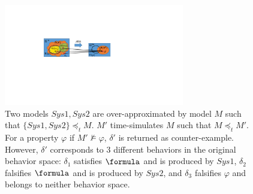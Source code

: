 %


\begin{figure}[!t]
		\centering
		\includegraphics[width=0.7\textwidth]{figs/SysVSEnv.pdf}
		\caption{\small Two models $Sys1, Sys2$ are over-approximated by model $M$ such that $\{Sys1,Sys2\}\preceq_t M$. $M'$ time-simulates $M$ such that $M\preceq_t M'$. For a property $\varphi$ if $M'\not\models\varphi$, $\delta'$ is returned as counter-example. However, $\delta'$ corresponds to 3 different behaviors in the original behavior space: $\delta_1$ satisfies $\formula$ and is produced by $Sys1$, $\delta_2$ falsifies $\formula$ and is produced by $Sys2$, and $\delta_3$ falsifies $\varphi$ and belongs to neither behavior space.}
		  \vspace{-15pt}
		\label{fig:ambiguity}
\end{figure}

